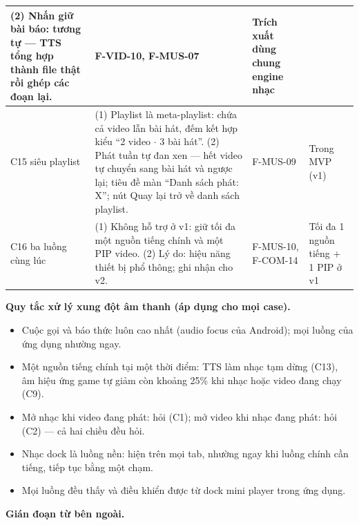 \begin{longtable}{>{\raggedright\arraybackslash}p{1.5cm} >{\raggedright\arraybackslash}p{8.6cm} >{\raggedright\arraybackslash}p{2.5cm} >{\raggedright\arraybackslash}p{2.6cm}}
(2) Nhấn giữ bài báo: tương tự --- TTS tổng hợp thành file thật rồi ghép các đoạn lại. &
F-VID-10, F-MUS-07 &
Trích xuất dùng chung engine nhạc \\
\midrule
C15 \newline siêu playlist &
(1) Playlist là meta-playlist: chứa cả video lẫn bài hát, đếm kết hợp kiểu ``2 video $\cdot$ 3 bài hát''. \newline
(2) Phát tuần tự đan xen --- hết video tự chuyển sang bài hát và ngược lại; tiêu đề màn ``Danh sách phát: X''; nút Quay lại trở về danh sách playlist. &
F-MUS-09 &
Trong MVP (v1) \\
\midrule
C16 \newline ba luồng cùng lúc &
(1) Không hỗ trợ ở v1: giữ tối đa một nguồn tiếng chính và một PIP video. \newline
(2) Lý do: hiệu năng thiết bị phổ thông; ghi nhận cho v2. &
F-MUS-10, F-COM-14 &
Tối đa 1 nguồn tiếng + 1 PIP ở v1 \\
\end{longtable}

\textbf{Quy tắc xử lý xung đột âm thanh (áp dụng cho mọi case).}

\begin{itemize}
    \item Cuộc gọi và báo thức luôn cao nhất (audio focus của Android); mọi luồng của ứng dụng nhường ngay.
    \item Một nguồn tiếng chính tại một thời điểm: TTS làm nhạc tạm dừng (C13), âm hiệu ứng game tự giảm còn khoảng 25\% khi nhạc hoặc video đang chạy (C9).
    \item Mở nhạc khi video đang phát: hỏi (C1); mở video khi nhạc đang phát: hỏi (C2) --- cả hai chiều đều hỏi.
    \item Nhạc dock là luồng nền: hiện trên mọi tab, nhường ngay khi luồng chính cần tiếng, tiếp tục bằng một chạm.
    \item Mọi luồng đều thấy và điều khiển được từ dock mini player trong ứng dụng.
\end{itemize}

\textbf{Gián đoạn từ bên ngoài.}

